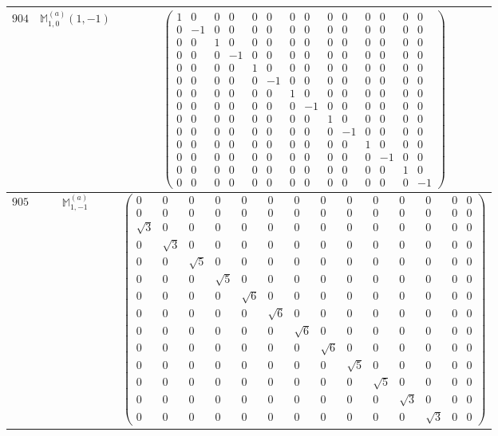 \documentclass[fleqn,8pt,landscape]{jsarticle}
\begin{document}
\begin{center}
\begin{longtable}{ccc}
$ 904 $ & $ \mathbb{M}_{1,0}^{(a)}(1,-1) $ & $ \begin{pmatrix} 1 & 0 & 0 & 0 & 0 & 0 & 0 & 0 & 0 & 0 & 0 & 0 & 0 & 0 \\ 0 & -1 & 0 & 0 & 0 & 0 & 0 & 0 & 0 & 0 & 0 & 0 & 0 & 0 \\ 0 & 0 & 1 & 0 & 0 & 0 & 0 & 0 & 0 & 0 & 0 & 0 & 0 & 0 \\ 0 & 0 & 0 & -1 & 0 & 0 & 0 & 0 & 0 & 0 & 0 & 0 & 0 & 0 \\ 0 & 0 & 0 & 0 & 1 & 0 & 0 & 0 & 0 & 0 & 0 & 0 & 0 & 0 \\ 0 & 0 & 0 & 0 & 0 & -1 & 0 & 0 & 0 & 0 & 0 & 0 & 0 & 0 \\ 0 & 0 & 0 & 0 & 0 & 0 & 1 & 0 & 0 & 0 & 0 & 0 & 0 & 0 \\ 0 & 0 & 0 & 0 & 0 & 0 & 0 & -1 & 0 & 0 & 0 & 0 & 0 & 0 \\ 0 & 0 & 0 & 0 & 0 & 0 & 0 & 0 & 1 & 0 & 0 & 0 & 0 & 0 \\ 0 & 0 & 0 & 0 & 0 & 0 & 0 & 0 & 0 & -1 & 0 & 0 & 0 & 0 \\ 0 & 0 & 0 & 0 & 0 & 0 & 0 & 0 & 0 & 0 & 1 & 0 & 0 & 0 \\ 0 & 0 & 0 & 0 & 0 & 0 & 0 & 0 & 0 & 0 & 0 & -1 & 0 & 0 \\ 0 & 0 & 0 & 0 & 0 & 0 & 0 & 0 & 0 & 0 & 0 & 0 & 1 & 0 \\ 0 & 0 & 0 & 0 & 0 & 0 & 0 & 0 & 0 & 0 & 0 & 0 & 0 & -1 \end{pmatrix} $ \\ \hline
$ 905 $ & $ \mathbb{M}_{1,-1}^{(a)} $ & $ \begin{pmatrix} 0 & 0 & 0 & 0 & 0 & 0 & 0 & 0 & 0 & 0 & 0 & 0 & 0 & 0 \\ 0 & 0 & 0 & 0 & 0 & 0 & 0 & 0 & 0 & 0 & 0 & 0 & 0 & 0 \\ \sqrt{3} & 0 & 0 & 0 & 0 & 0 & 0 & 0 & 0 & 0 & 0 & 0 & 0 & 0 \\ 0 & \sqrt{3} & 0 & 0 & 0 & 0 & 0 & 0 & 0 & 0 & 0 & 0 & 0 & 0 \\ 0 & 0 & \sqrt{5} & 0 & 0 & 0 & 0 & 0 & 0 & 0 & 0 & 0 & 0 & 0 \\ 0 & 0 & 0 & \sqrt{5} & 0 & 0 & 0 & 0 & 0 & 0 & 0 & 0 & 0 & 0 \\ 0 & 0 & 0 & 0 & \sqrt{6} & 0 & 0 & 0 & 0 & 0 & 0 & 0 & 0 & 0 \\ 0 & 0 & 0 & 0 & 0 & \sqrt{6} & 0 & 0 & 0 & 0 & 0 & 0 & 0 & 0 \\ 0 & 0 & 0 & 0 & 0 & 0 & \sqrt{6} & 0 & 0 & 0 & 0 & 0 & 0 & 0 \\ 0 & 0 & 0 & 0 & 0 & 0 & 0 & \sqrt{6} & 0 & 0 & 0 & 0 & 0 & 0 \\ 0 & 0 & 0 & 0 & 0 & 0 & 0 & 0 & \sqrt{5} & 0 & 0 & 0 & 0 & 0 \\ 0 & 0 & 0 & 0 & 0 & 0 & 0 & 0 & 0 & \sqrt{5} & 0 & 0 & 0 & 0 \\ 0 & 0 & 0 & 0 & 0 & 0 & 0 & 0 & 0 & 0 & \sqrt{3} & 0 & 0 & 0 \\ 0 & 0 & 0 & 0 & 0 & 0 & 0 & 0 & 0 & 0 & 0 & \sqrt{3} & 0 & 0 \end{pmatrix} $ \\ \hline

\end{longtable}
\end{center}
\end{document}
